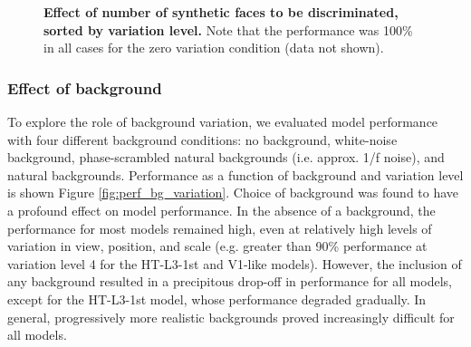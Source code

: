 \begin{figure}[ht]
{  \label{fig:nfaces_var4}
}

\caption[]{{\bf Effect of number of synthetic faces to be discriminated, sorted by variation level.} Note that the performance was 100\% in all cases for the zero variation condition (data not shown).}
\label{fig:nfaces_by_variation}
\end{figure}


\subsubsection{Effect of background}

To explore the role of background variation, we evaluated model performance with four different background conditions: no background, white-noise background, phase-scrambled natural backgrounds (i.e. approx. 1/f noise), and natural backgrounds.  Performance as a function of background and variation level is shown Figure \ref{fig:perf_bg_variation}.  Choice of background was found to have a profound effect on model performance.  In the absence of a background, the performance for most models remained high, even at relatively high levels of variation in view, position, and scale (e.g. greater than 90\% performance at variation level 4 for the HT-L3-1st and V1-like models).  However, the inclusion of any background resulted in a precipitous drop-off in performance for all models, except for the HT-L3-1st model, whose performance degraded gradually.  In general, progressively more realistic backgrounds proved increasingly difficult for all models.


